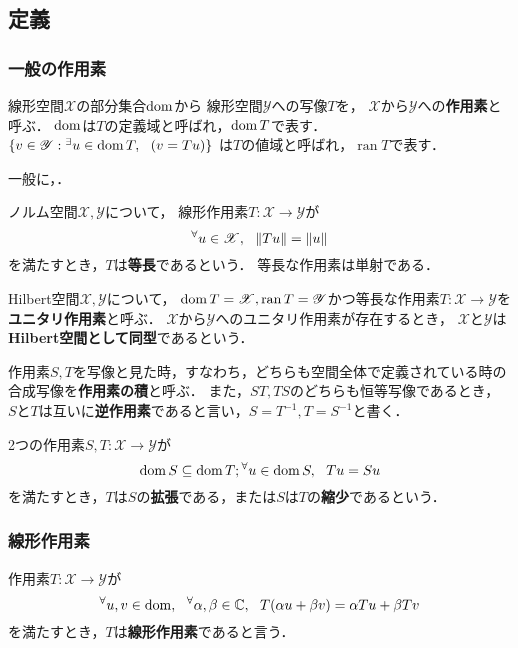 \documentclass[a4j]{jsarticle}
\newcommand{\ran}{\operatorname{ran}}
\newcommand{\spX}{\mathscr{X}}
\newcommand{\spY}{\mathscr{Y}}
\begin{document}
    \subsection{定義}
    \subsubsection{一般の作用素}
    \begin{Def}
        線形空間$\spX$の部分集合$\operatorname{dom}$から
        線形空間$\spY$への写像$T$を，
        $\spX$から$\spY$への\textbf{作用素}と呼ぶ．
        $\operatorname{dom}$は$T$の定義域と呼ばれ，$\operatorname{dom} T$で表す．
        $\{v \in \spY : \Exists{u \in \dom T} (v=Tu)\}$
        は$T$の値域と呼ばれ，$\ran T$で表す．
    \end{Def}
    一般に，．

    \begin{Def}
        ノルム空間$\spX, \spY$について，
        線形作用素$T:\spX \to \spY$が
        \[ \Forall{ u \in \spX} \| Tu \|=\|u\| \]
        を満たすとき，$T$は\textbf{等長}であるという．
        等長な作用素は単射である．
    \end{Def}

    \begin{Def}
        Hilbert空間$\spX, \spY$について，
        $\dom T=\spX, \ran T=\spY$かつ等長な作用素$T:\spX \to \spY$を\textbf{ユニタリ作用素}と呼ぶ．
        $\spX$から$\spY$へのユニタリ作用素が存在するとき，
        $\spX$と$\spY$は\textbf{Hilbert空間として同型}であるという．
    \end{Def}

    \begin{Def}
        作用素$S,T$を写像と見た時，すなわち，どちらも空間全体で定義されている時の合成写像を\textbf{作用素の積}と呼ぶ．
        また，$ST, TS$のどちらも恒等写像であるとき，
        $S$と$T$は互いに\textbf{逆作用素}であると言い，$S=T^{-1}, T=S^{-1}$と書く．
    \end{Def}

    \begin{Def}
        2つの作用素$S,T:\spX \to \spY$が
        \[ \operatorname{dom} S \subseteq \operatorname{dom} T; {}^{\forall}  u \in \operatorname{dom} S,~~ Tu=Su \]
        を満たすとき，$T$は$S$の\textbf{拡張}である，または$S$は$T$の\textbf{縮少}であるという．
    \end{Def}

    \subsubsection{線形作用素}
    \begin{Def}
        作用素$T:\spX \to \spY$が
        \[ {}^{\forall}  u,v \in \operatorname{dom},~~ {}^{\forall} \alpha, \beta \in \mathbb{C},~~ T(\alpha u+\beta v)=\alpha Tu+\beta Tv \]
        を満たすとき，$T$は\textbf{線形作用素}であると言う．
    \end{Def}
\end{document}
